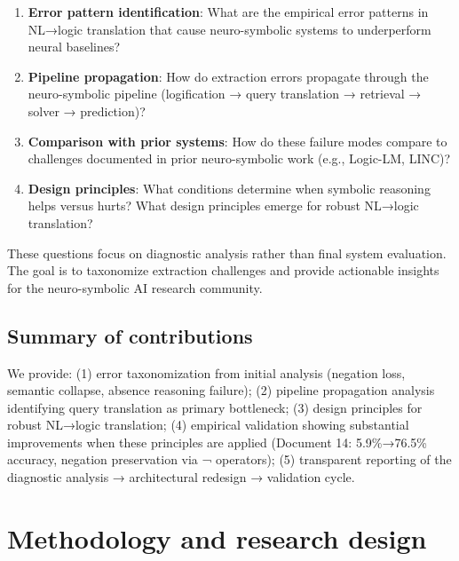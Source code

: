 \documentclass[12pt,a4paper]{article}
\begin{document}
\begin{enumerate}
\item \textbf{Error pattern identification}: What are the empirical error patterns in NL→logic translation that cause neuro-symbolic systems to underperform neural baselines?
\item \textbf{Pipeline propagation}: How do extraction errors propagate through the neuro-symbolic pipeline (logification → query translation → retrieval → solver → prediction)?
\item \textbf{Comparison with prior systems}: How do these failure modes compare to challenges documented in prior neuro-symbolic work (e.g., Logic-LM, LINC)?
\item \textbf{Design principles}: What conditions determine when symbolic reasoning helps versus hurts? What design principles emerge for robust NL→logic translation?
\end{enumerate}

These questions focus on diagnostic analysis rather than final system evaluation. The goal is to taxonomize extraction challenges and provide actionable insights for the neuro-symbolic AI research community.

\subsection{Summary of contributions}

We provide: (1) error taxonomization from initial analysis (negation loss, semantic collapse, absence reasoning failure); (2) pipeline propagation analysis identifying query translation as primary bottleneck; (3) design principles for robust NL→logic translation; (4) empirical validation showing substantial improvements when these principles are applied (Document 14: 5.9\%→76.5\% accuracy, negation preservation via ¬ operators); (5) transparent reporting of the diagnostic analysis → architectural redesign → validation cycle.



\section{Methodology and research design}
\end{document}
